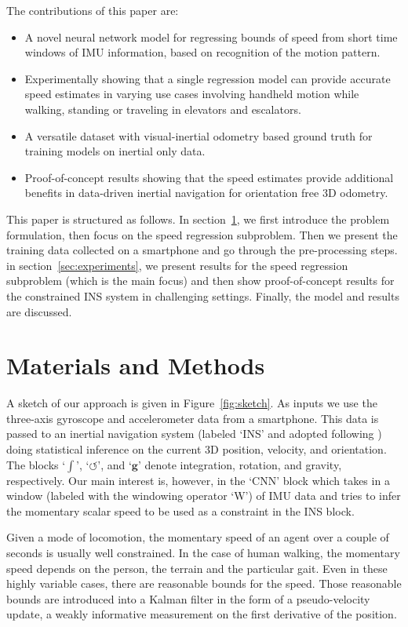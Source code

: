 \documentclass{article}
\newcommand{\mbf}[1]{\mathbf{#1}}
\newcommand{\vect}[1]{\mbf{#1}}
\begin{document}
The contributions of this paper are:
\begin{itemize}
  \item A novel neural network model for regressing bounds of speed from short time windows of IMU information, based on recognition of the motion pattern.
  \item Experimentally showing that a single regression model can provide accurate speed estimates in varying use cases involving handheld motion while walking, standing or traveling in elevators and escalators. 
  \item A versatile dataset with visual-inertial odometry based ground truth for training models on inertial only data.
\item Proof-of-concept results showing that the speed estimates provide additional benefits in data-driven inertial navigation for orientation free 3D odometry.
\end{itemize}

This paper is structured as follows. In section~\ref{sec:methods}, we first introduce the problem formulation, then focus on the speed regression subproblem. Then we present the training data collected on a smartphone and go through the pre-processing steps. in section~\ref{sec:experiments}, we present results for the speed regression subproblem (which is the main focus) and then show proof-of-concept results for the constrained INS system in challenging settings. Finally, the model and results are discussed. 




\section{Materials and Methods}
\label{sec:methods}
A sketch of our approach is given in Figure~\ref{fig:sketch}. As inputs we use the three-axis gyroscope and accelerometer data from a smartphone. This data is passed to an inertial navigation system (labeled `INS' and adopted following \cite{Solin+Cortes+Rahtu+Kannala}) doing statistical inference on the current 3D position, velocity, and orientation. The blocks `$\int$', `$\circlearrowleft$', and `$\vect{g}$' denote integration, rotation, and gravity, respectively. Our main interest is, however, in the `CNN' block which takes in a window (labeled with the windowing operator `W') of IMU data and tries to infer the momentary scalar speed to be used as a constraint in the INS block.

Given a mode of locomotion, the momentary speed of an agent over a couple of seconds is usually well constrained. In the case of human walking, the momentary speed depends on the person, the terrain and the particular gait. Even in these highly variable cases, there are reasonable bounds for the speed. Those reasonable bounds are introduced into a Kalman filter in the form of a pseudo-velocity update, a weakly informative measurement on the first derivative of the position. 
\end{document}
